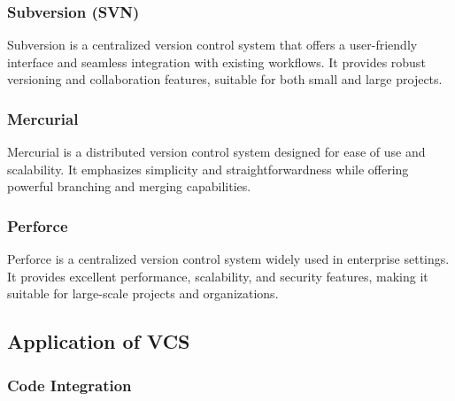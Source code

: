 \subsubsection*{Subversion (SVN)}
Subversion is a centralized version control system that offers a user-friendly interface and seamless integration with existing workflows. It provides robust versioning and collaboration features, suitable for both small and large projects.

\subsubsection*{Mercurial}
Mercurial is a distributed version control system designed for ease of use and scalability. It emphasizes simplicity and straightforwardness while offering powerful branching and merging capabilities.

\subsubsection*{Perforce}
Perforce is a centralized version control system widely used in enterprise settings. It provides excellent performance, scalability, and security features, making it suitable for large-scale projects and organizations.

\subsection*{Application of VCS}

\subsubsection*{Code Integration}

